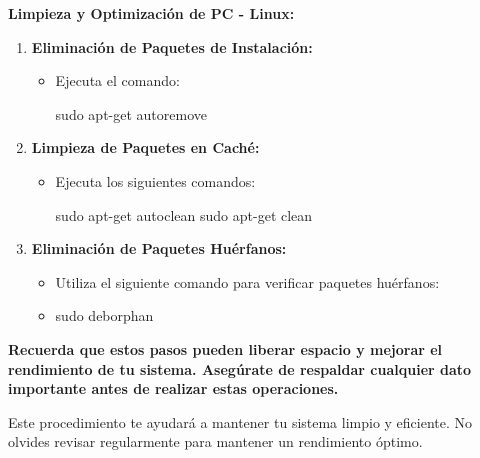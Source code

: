 \documentclass[
  jou,
  floatsintext,
  longtable,
  a4paper,
  nolmodern,
  notxfonts,
  notimes,
  12pt,
  colorlinks=true,linkcolor=blue,citecolor=blue,urlcolor=blue]{apa7}
\newenvironment{Shaded}{\begin{snugshade}}{\end{snugshade}}
\newcommand{\FunctionTok}[1]{\textcolor[rgb]{0.28,0.35,0.67}{#1}}
\newcommand{\NormalTok}[1]{\textcolor[rgb]{0.00,0.23,0.31}{#1}}
\begin{document}
\textbf{Limpieza y Optimización de PC - Linux:}

\begin{enumerate}
\def\labelenumi{\arabic{enumi}.}
\item
  \textbf{Eliminación de Paquetes de Instalación:}

  \begin{itemize}
  \item
    Ejecuta el comando:

\begin{Shaded}
\begin{Highlighting}[]
\FunctionTok{sudo}\NormalTok{ apt{-}get autoremove}
\end{Highlighting}
\end{Shaded}
  \end{itemize}
\item
  \textbf{Limpieza de Paquetes en Caché:}

  \begin{itemize}
  \item
    Ejecuta los siguientes comandos:

\begin{Shaded}
\begin{Highlighting}[]
\FunctionTok{sudo}\NormalTok{ apt{-}get autoclean}
\FunctionTok{sudo}\NormalTok{ apt{-}get clean}
\end{Highlighting}
\end{Shaded}
  \end{itemize}
\item
  \textbf{Eliminación de Paquetes Huérfanos:}

  \begin{itemize}
  \item
    Utiliza el siguiente comando para verificar paquetes huérfanos:
  \item
\begin{Shaded}
\begin{Highlighting}[]
\FunctionTok{sudo}\NormalTok{ deborphan}
\end{Highlighting}
\end{Shaded}
  \end{itemize}
\end{enumerate}

\textbf{Recuerda que estos pasos pueden liberar espacio y mejorar el
rendimiento de tu sistema. Asegúrate de respaldar cualquier dato
importante antes de realizar estas operaciones.}

Este procedimiento te ayudará a mantener tu sistema limpio y eficiente.
No olvides revisar regularmente para mantener un rendimiento óptimo.
\end{document}
